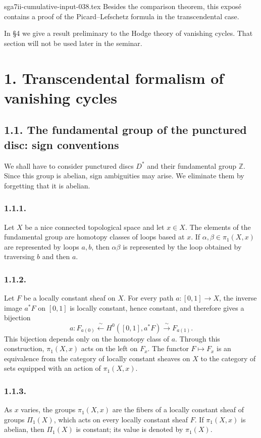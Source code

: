 \begin{filecontents*}{sga7ii-cumulative-input-038.tex}
Besides the comparison theorem, this expos\'e contains a proof of the
Picard--Lefschetz formula in the transcendental case.

In \S4 we give a result preliminary to the Hodge theory of vanishing
cycles.  That section will not be used later in the seminar.

\section*{1. Transcendental formalism of vanishing cycles}

\subsection*{1.1. The fundamental group of the punctured disc:
sign conventions}

We shall have to consider punctured discs $D^*$ and their fundamental
group $\mathbb Z$.  Since this group is abelian, sign ambiguities may
arise.  We eliminate them by forgetting that it is abelian.

\subsubsection*{1.1.1.}
Let $X$ be a nice connected topological space and let $x\in X$.
The elements of the fundamental group are homotopy classes of loops
based at $x$.  If $\alpha,\beta\in\pi_1(X,x)$ are represented by
loops $a,b$, then $\alpha\beta$ is represented by the loop obtained
by traversing $b$ and then $a$.

\subsubsection*{1.1.2.}
Let $F$ be a locally constant sheaf on $X$.  For every path
$a:[0,1]\longrightarrow X$, the inverse image $a^*F$ on $[0,1]$ is
locally constant, hence constant, and therefore gives a bijection
\[
a:F_{a(0)}
\xleftarrow{\ \sim\ }H^0([0,1],a^*F)
\xrightarrow{\ \sim\ }F_{a(1)}.
\]
This bijection depends only on the homotopy class of $a$.  Through
this construction, $\pi_1(X,x)$ acts on the left on $F_x$.  The
functor $F\longmapsto F_x$ is an equivalence from the category of
locally constant sheaves on $X$ to the category of sets equipped with
an action of $\pi_1(X,x)$.

\subsubsection*{1.1.3.}
As $x$ varies, the groups $\pi_1(X,x)$ are the fibers of a locally
constant sheaf of groups $\Pi_1(X)$, which acts on every locally
constant sheaf $F$.  If $\pi_1(X,x)$ is abelian, then $\Pi_1(X)$ is
constant; its value is denoted by $\pi_1(X)$.


\end{filecontents*}
